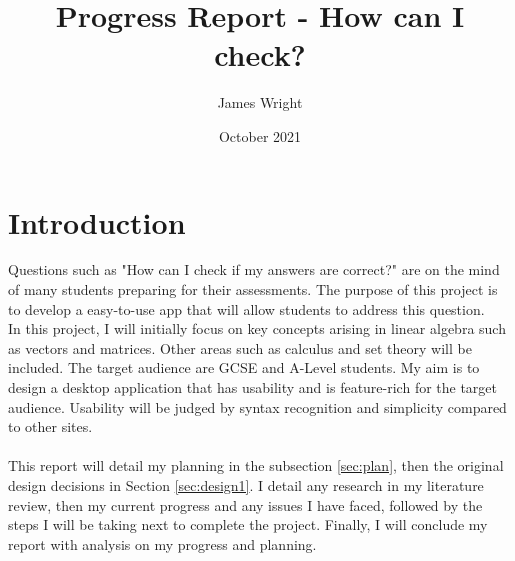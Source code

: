 \documentclass[final]{cmpreport}
\title{Progress Report - How can I check?}
\author{James Wright }
\date{October 2021}
\begin{document}
	
	\section{Introduction}
	
	Questions such as "How can I check if my answers are correct?" are on the mind of many students preparing for their assessments. The purpose of this project is to develop a easy-to-use app that will allow students to address this question.\\
	
	In this project, I will initially focus on key concepts arising in linear algebra such as vectors and matrices. Other areas such as calculus and set theory will be included. The target audience are GCSE and A-Level students. My aim is to design a desktop application that has usability and is feature-rich for the target audience. Usability will be judged by syntax recognition and simplicity compared to other sites. \\
	\\This report will detail my planning in the subsection \ref{sec:plan}, then the original design decisions in Section \ref{sec:design1}. I detail any research in my literature review, then my current progress and any issues I have faced, followed by the steps I will be taking next to complete the project. Finally, I will conclude my report with analysis on my progress and planning.
\end{document}
